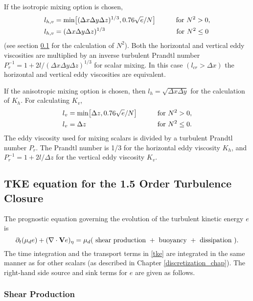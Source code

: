 If the isotropic mixing option is chosen,
%
\begin{align}
l_{h,v} & = \hbox{min} 
\bigl[(\Delta x \Delta y \Delta z)^{1/3}, 0.76 \sqrt{e} / N\bigr]
\quad\quad\quad
\hbox{for } N^2 > 0, 
\notag \\
l_{h,v} & = (\Delta x \Delta y \Delta z)^{1/3} 
\,\,\,\,\,
\hphantom{hbox{min}\bigl[,0.76 \sqrt{e} / N\bigr]}
\hbox{for } N^2 \le 0
\notag 
\end{align} 
%
(see section \ref{tke_section} for the calculation of $N^2$).
Both the horizontal and vertical eddy viscosities are multiplied by an
inverse turbulent
Prandtl number $P_r^{-1} = 1 + 2l/(\Delta x \Delta y \Delta z)^{1/3}$ for
scalar mixing.  In this case $(l_{cr} > \Delta x)$ the 
horizontal and vertical eddy viscosities
are equivalent.

If the anisotropic mixing option is chosen, 
then $l_h=\sqrt{\Delta x \Delta y}$ for the calculation of $K_h$.
For calculating $K_v$, 
%
\begin{align} l_v &= \hbox{min} 
\bigl[\Delta z, 0.76 \sqrt{e} / N\bigr]
\quad\quad\quad \hbox{for } N^2 > 0,
\notag \\
l_v &= \Delta z \hphantom{\hbox{min} 
\bigl[, 0.76 \sqrt{e} / N\bigr]} \quad\quad\quad \hbox{for } N^2 \le 0.
\notag
\end{align} 
%
\noindent
The eddy viscosity used for mixing scalars is divided by a
turbulent Prandtl number $P_r$.  
The Prandtl number is 1/3 for the
horizontal eddy viscosity $K_h$,
and $P_r^{-1} = 1 + 2l/\Delta z$ for the
vertical eddy viscosity $K_v$.

\subsection{TKE equation for the 1.5 Order Turbulence Closure}
\label{tke_section}

The prognostic equation governing the evolution of the 
turbulent kinetic energy $e$ is 
%
\begin{equation}
 \partial_t (\mu_d e) + (\nabla \cdot {\bf V} e )_\eta 
= \mu_d (\hbox{ shear production } + \hbox{ buoyancy } + \hbox{ dissipation }).
\label{tke}
\end{equation}
%
\noindent
The time integration and the transport terms in \eqref{tke} are
integrated in the same manner as for other scalars (as described in
Chapter \ref{discretization_chap}). The right-hand side source and sink terms for $e$ are
given as follows.

\subsubsection{Shear Production}

